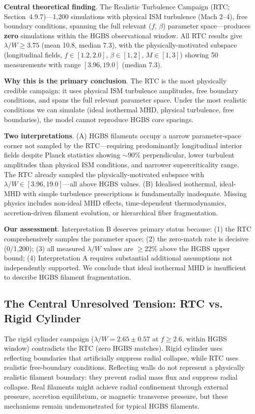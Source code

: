 \documentclass[twocolumn]{mnras}
\begin{document}
\textbf{Central theoretical finding}. The Realistic Turbulence Campaign (RTC; Section~4.9.7)---1,200 simulations with physical ISM turbulence (Mach 2--4), free boundary conditions, spanning the full relevant ($f$, $\beta$) parameter space---produces \textbf{zero} simulations within the HGBS observational window. All RTC results give $\lambda/W \geq 3.75$ (mean 10.8, median 7.3), with the physically-motivated subspace (longitudinal fields, $f \in [1.2, 2.0]$, $\beta \in [1, 2]$, $M \in [1, 3]$) showing 50 measurements with range $[3.96, 19.0]$ (median 7.3).

\textbf{Why this is the primary conclusion}. The RTC is the most physically credible campaign: it uses physical ISM turbulence amplitudes, free boundary conditions, and spans the full relevant parameter space. Under the most realistic conditions we can simulate (ideal isothermal MHD, physical turbulence, free boundaries), the model cannot reproduce HGBS core spacings.

\textbf{Two interpretations}. (A) HGBS filaments occupy a narrow parameter-space corner not sampled by the RTC---requiring predominantly longitudinal interior fields despite Planck statistics showing $\sim$90\% perpendicular, lower turbulent amplitudes than physical ISM conditions, and narrower supercriticality range. The RTC already sampled the physically-motivated subspace with $\lambda/W \in [3.96, 19.0]$---all above HGBS values. (B) Idealised isothermal, ideal-MHD with simple turbulence prescriptions is fundamentally inadequate. Missing physics includes non-ideal MHD effects, time-dependent thermodynamics, accretion-driven filament evolution, or hierarchical fiber fragmentation.

\textbf{Our assessment}. Interpretation B deserves primary status because: (1) the RTC comprehensively samples the parameter space; (2) the zero-match rate is decisive (0/1,200); (3) all measured $\lambda/W$ values are $\geq$22\% above the HGBS upper bound; (4) Interpretation A requires substantial additional assumptions not independently supported. We conclude that ideal isothermal MHD is insufficient to describe HGBS filament fragmentation.

\subsection{The Central Unresolved Tension: RTC vs. Rigid Cylinder}

The rigid cylinder campaign ($\lambda/W = 2.65 \pm 0.57$ at $f \geq 2.6$, within HGBS window) contradicts the RTC (zero HGBS matches). Rigid cylinder uses reflecting boundaries that artificially suppress radial collapse, while RTC uses realistic free-boundary conditions. Reflecting walls do not represent a physically realistic filament boundary: they prevent radial mass flux and suppress radial collapse. Real filaments might achieve radial confinement through external pressure, accretion equilibrium, or magnetic transverse pressure, but these mechanisms remain undemonstrated for typical HGBS filaments.
\end{document}
